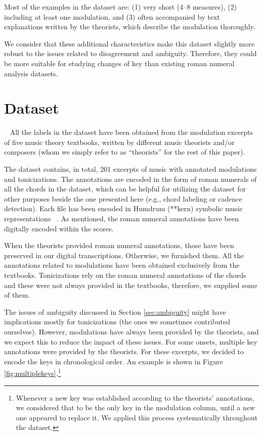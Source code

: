 \documentclass[sigconf]{acmart}
\begin{document}
Most of the examples in the dataset are: (1) very short (4--8 measures), (2) including at least one modulation, and (3) often accompanied by text explanations written by the theorists, which describe the modulation thoroughly.

We consider that these additional characteristics make this dataset slightly more robust to the issues related to disagreement and ambiguity. 
Therefore, they could be more suitable for studying changes of key than existing roman numeral analysis datasets.



\section{Dataset}~\label{sec:dataset}
All the labels in the dataset have been obtained from the modulation excerpts of five music theory textbooks, written by different music theorists and/or composers (whom we simply refer to as ``theorists'' for the rest of this paper).

The dataset contains, in total, 201 excerpts of music with annotated modulations and tonicizations. 
The annotations are encoded in the form of roman numerals of all the chords in the dataset, which can be helpful for utilizing the dataset for other purposes beside the one presented here (e.g., chord labeling or cadence detection).
Each file has been encoded in Humdrum (**kern) symbolic music representations ~\cite{huron02humdrum}. 
As mentioned, the roman numeral annotations have been digitally encoded \cite{napoleslopez20harmalysis} within the scores.

When the theorists provided roman numeral annotations, those have been preserved in our digital transcriptions. 
Otherwise, we furnished them. All the annotations related to modulations have been obtained exclusively from the textbooks. 
Tonicizations rely on the roman numeral annotations of the chords and these were not always provided in the textbooks, therefore, we supplied some of them.

The issues of ambiguity discussed in Section \ref{sec:ambiguity} might have implications mostly for tonicizations (the ones we sometimes contributed ourselves).
However, modulations have always been provided by the theorists, and we expect this to reduce the impact of these issues. 
For some onsets, multiple key annotations were provided by the theorists. For these excerpts, we decided to encode the keys in chronological order. 
An example is shown in Figure \ref{fig:multiplekeys}.\footnote{Whenever a new key was established according to the theorists' annotations, we considered that to be the only key in the modulation column, until a new one appeared to replace it. 
We applied this process systematically throughout the dataset. %
}
\end{document}

